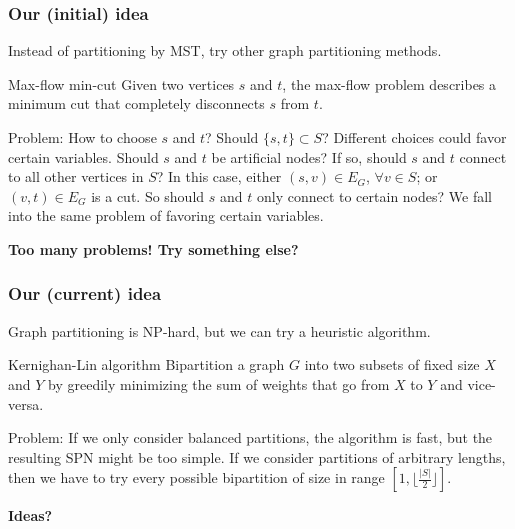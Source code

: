 \documentclass[usenames,dvipsnames]{beamer}
\begin{document}
\begin{frame}
  \frametitle{Our (initial) idea}

  Instead of partitioning by MST, try other graph partitioning methods.

  \begin{block}{Max-flow min-cut}
    Given two vertices $s$ and $t$, the max-flow problem describes a minimum cut that completely
    disconnects $s$ from $t$.
  \end{block}
  \begin{alertblock}{Problem:}
    How to choose $s$ and $t$? Should $\{s,t\}\subset S$? Different choices could favor certain
    variables. Should $s$ and $t$ be artificial nodes? If so, should $s$ and $t$ connect to all
    other vertices in $S$? In this case, either $(s,v)\in E_G$, $\forall v\in S$; or $(v,t)\in E_G$
    is a cut. So should $s$ and $t$ only connect to certain nodes? We fall into the same problem of
    favoring certain variables.
  \end{alertblock}
  \vspace{0.25cm}

  \textbf{Too many problems! Try something else?}
\end{frame}

\begin{frame}
  \frametitle{Our (current) idea}

  Graph partitioning is NP-hard, but we can try a heuristic algorithm.

  \begin{block}{Kernighan-Lin algorithm}
    Bipartition a graph $G$ into two subsets of fixed size $X$ and $Y$ by greedily minimizing the
    sum of weights that go from $X$ to $Y$ and vice-versa.
  \end{block}
  \begin{alertblock}{Problem:}
    If we only consider balanced partitions, the algorithm is fast, but the resulting SPN might be
    too simple. If we consider partitions of arbitrary lengths, then we have to try every possible
    bipartition of size in range $[1,\lfloor\frac{|S|}{2}\rfloor]$.
  \end{alertblock}
  \vspace{0.25cm}

  \textbf{Ideas?}
\end{frame}
\end{document}
